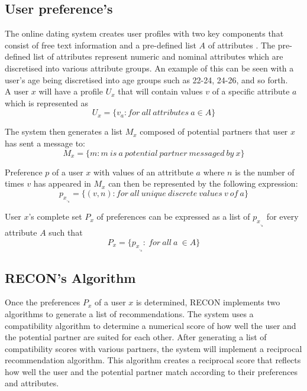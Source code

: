 \documentclass[11pt]{article}
\begin{document}
 \subsection{User preference's}
 The online dating system creates user profiles with two key components that consist of free text information and a pre-defined list $A$ of attributes \cite{RECON}. The pre-defined list of attributes represent numeric and nominal attributes which are discretised into various attribute groups. An example of this can be seen with a user's age being discretised into age groups such as 22-24, 24-26, and so forth. \\
\indent A user $x$ will have a profile $U_x$ that will contain values $v$ of a specific attribute $a$ which is represented as
\begin{equation}
U_x= \{v_a: for\ all\ attributes\ a \in A\}
\end{equation}

The system then generates a list $M_x$ composed of potential partners that user $x$ has sent a message to:
\begin{equation}
M_x= \{m: m\ is\ a\ potential\ partner\ messaged\ by\ x\}
\end{equation}

Preference $p$ of a user $x$ with values of an attritbute $a$ where $n$ is the number of times $v$ has appeared in $M_x$ can then be represented by the following expression:
\begin{equation}
p_x_,_a = \{(v,n): for\ all\ unique\ discrete\ values\ v\ of\ a\}
\end{equation}

User $x$'s complete set $P_x$ of preferences can be expressed as a list of $p_x_,_a$ for every attribute $A$ such that
\begin{equation}
P_x = \{p_x_,_a:\ for\ all\ a\ \in A \}
\end{equation}

 \subsection{RECON's Algorithm}
 Once the preferences $P_x$ of a user $x$ is determined, RECON implements two algorithms to generate a list of recommendations. The system uses a compatibility algorithm to determine a numerical score of how well the user and the potential partner are suited for each other. After generating a list of compatibility scores with various partners, the system will implement a reciprocal recommendation algorithm. This algorithm creates a reciprocal score that reflects how well the user and the potential partner match according to their preferences and attributes.
 
\end{document}

